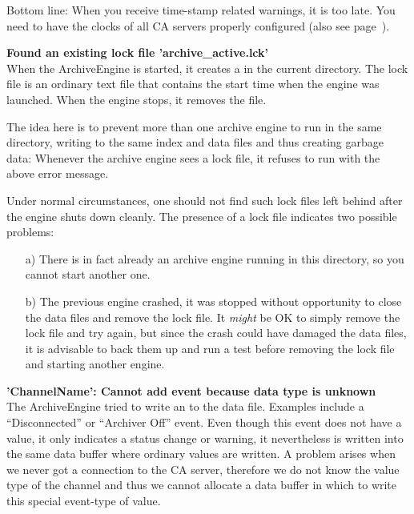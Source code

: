 Bottom line: When you receive time-stamp related warnings, it is too
late. You need to have the clocks of all CA servers properly configured
(also see page~\pageref{back:in:time}).

\noindent
\textbf{Found an existing lock file 'archive\_active.lck'}\\
When the ArchiveEngine is started, it creates a  in
the current directory. The lock file is an ordinary text file
that contains the start time when the engine was launched. When
the engine stops, it removes the file.

The idea here is to prevent more than one archive engine to run
in the same directory, writing to the same index and data files
and thus creating garbage data: Whenever the archive engine sees
a lock file, it refuses to run with the above error message.

Under normal circumstances, one should not find such lock files
left behind after the engine shuts down cleanly. The presence of
a lock file indicates two possible problems:
\begin{enumerate}
\item[a)] There is in fact already an archive engine running in
this directory, so you cannot start another one.
\item[b)] The previous engine crashed, it was stopped without
opportunity to close the data files and remove the lock file.
It \emph{might} be OK to simply remove the lock file and try
again, but since the crash could have damaged the data files, it
is advisable to back them up and run a test before removing the
lock file and starting another engine.
\end{enumerate}

\noindent
\textbf{'ChannelName': Cannot add event because data type is unknown}\\
The ArchiveEngine tried to write an  to the data
file. Examples include a ``Disconnected'' or ``Archiver Off''
event. Even though this event does not have a value, it only
indicates a status change or warning, it nevertheless is written
into the same data buffer where ordinary values are written.
A problem arises when we never got a connection to the CA
server, therefore we do not know the value type of the channel
and thus we cannot allocate a data buffer in which to write this
special event-type of value.

